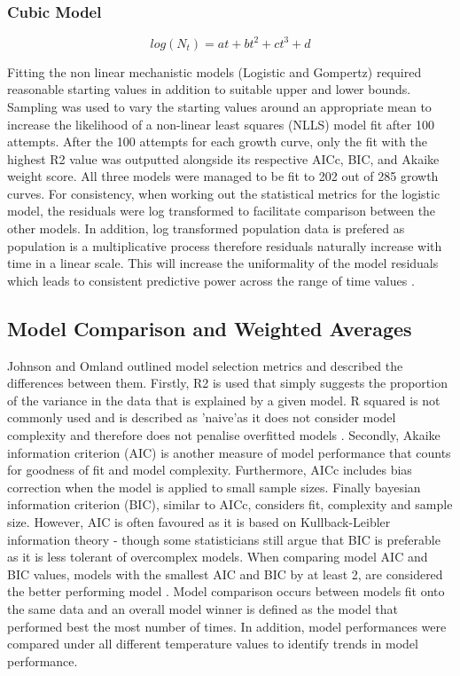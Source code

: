 \documentclass[11pt]{article}
\begin{document}
    \subsubsection{Cubic Model}
    \begin{equation}
        log(N_t) = at + bt^2 + ct^3 + d
    \end{equation}

Fitting the non linear mechanistic models (Logistic and Gompertz) required reasonable starting values in addition to suitable upper and lower bounds. Sampling was used to vary the starting values around an appropriate mean to increase the likelihood of a non-linear least squares (NLLS) model fit after 100 attempts. After the 100 attempts for each growth curve, only the fit with the highest R2 value was outputted alongside its respective AICc, BIC, and Akaike weight score. All three models were managed to be fit to 202 out of 285 growth curves. For consistency, when working out the statistical metrics for the logistic model, the residuals were log transformed to facilitate comparison between the other models. In addition, log transformed population data is prefered as population is a multiplicative process therefore residuals naturally increase with time in a linear scale. This will increase the uniformality of the model residuals which leads to consistent predictive power across the range of time values \cite{Freckleton2002}.


    \subsection{Model Comparison and Weighted Averages}
Johnson and Omland outlined model selection metrics and described the differences between them. Firstly, R2 is used that simply suggests the proportion of the variance in the data that is explained by a given model. R squared is not commonly used and is described as 'naive'as it does not consider model complexity and therefore does not penalise overfitted models \cite{JOHNSON2004101}. Secondly, Akaike information criterion (AIC) is another measure of model performance that counts for goodness of fit and model complexity. Furthermore, AICc includes bias correction when the model is applied to small sample sizes. Finally bayesian information criterion (BIC), similar to AICc, considers fit, complexity and sample size. However, AIC is often favoured as it is based on Kullback-Leibler information theory \cite{JOHNSON2004101} - though some statisticians still argue that BIC is preferable as it is less tolerant of overcomplex models. When comparing model AIC and BIC values, models with the smallest AIC and BIC by at least 2, are considered the better performing model \cite{JOHNSON2004101}. Model comparison occurs between models fit onto the same data and an overall model winner is defined as the model that performed best the most number of times. In addition, model performances were compared under all different temperature values to identify trends in model performance.\\
\end{document}
